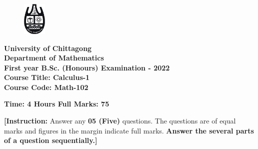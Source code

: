 \documentclass[12pt]{article}
\begin{document}
  \begin{center}
    \begin{figure}[t]
      \centering
      \includegraphics[width=0.1\textwidth]{cu_logo.png}
    \end{figure}

    {\bfseries \LARGE University of Chittagong\\
    Department of Mathematics\\
    First year B.Sc. (Honours) Examination - 2022\\
    Course Title: Calculus-1\\
    Course Code: Math-102\\[15pt]}

    {\bfseries \large Time: 4 Hours \hspace{16em} Full Marks: 75\\[15pt]}

    {\large \textbf{[Instruction:} Answer any \textbf{05 (Five)} questions. The questions are of equal marks and figures in the margin indicate full marks. \textbf{Answer the several parts of a question sequentially.]}\\[30pt]}
  \end{center}
\end{document}
